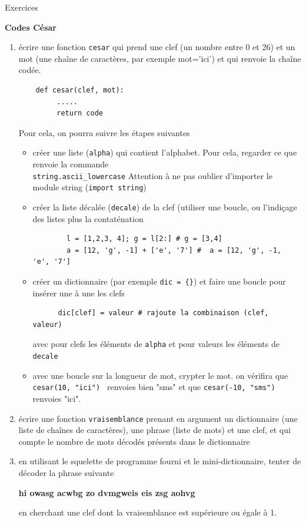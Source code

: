 \documentclass[12pt]{letter}
\begin{document}
\begin{center}
{\Large Exercices  }
\end{center}

\textbf{Codes César}
\begin{enumerate}
   \item écrire une fonction \texttt{cesar} qui prend une clef (un nombre entre 0 et 26) et un mot (une chaîne de caractères, par exemple mot='ici')
   et qui renvoie la chaîne codée. 
   \begin{lstlisting}
    def cesar(clef, mot):
         .....
         return code
   \end{lstlisting}
   Pour cela, on pourra suivre les étapes suivantes 
    \begin{itemize}
      \item créer une liste (\texttt{alpha}) qui contient l'alphabet. Pour cela, regarder ce que renvoie la commande \\ 
      \texttt{string.ascii\_lowercase}
      Attention à ne pas oublier d'importer le module string (\texttt{import string})
      \item créer la liste décalée (\texttt{decale}) de la clef (utiliser une boucle, ou l'indiçage des listes plus la contaténation 
      \begin{lstlisting}
        l = [1,2,3, 4]; g = l[2:] # g = [3,4]
        a = [12, 'g', -1] + ['e', '7'] #  a = [12, 'g', -1, 'e', '7']
       \end{lstlisting}
      \item créer un dictionnaire (par exemple \texttt{dic = \{\}}) et faire une boucle pour insérer une à une les clefs 
      \begin{lstlisting}
      dic[clef] = valeur # rajoute la combinaison (clef, valeur) 
      \end{lstlisting}
      avec pour clefs les éléments de \texttt{alpha} et pour valeurs les éléments de \texttt{decale}
      \item avec une boucle sur la longueur de mot, crypter le mot. on vérifira que
      \texttt{cesar(10, "ici") } renvoies bien "sms" et que \texttt{cesar(-10, "sms") } renvoies "ici".
    \end{itemize}
   \item écrire une fonction \texttt{vraisemblance} prenant en argument un dictionnaire (une liste de chaînes de caractères), 
   une phrase (liste de mots) et une clef, et qui compte le nombre de mots décodés présents dans le dictionnaire
   \item en utilisant le squelette de programme fourni et le mini-dictionnaire, tenter de décoder la phrase suivante \\
   \begin{center}
   {\large \bf hi owasg acwbg zo dvmgweis eis zsg aohvg}
   \end{center} 
   \vspace{0.5cm}
   en cherchant une clef dont la vraisemblance est supérieure ou égale à 1.
\end{enumerate}
\end{document}
